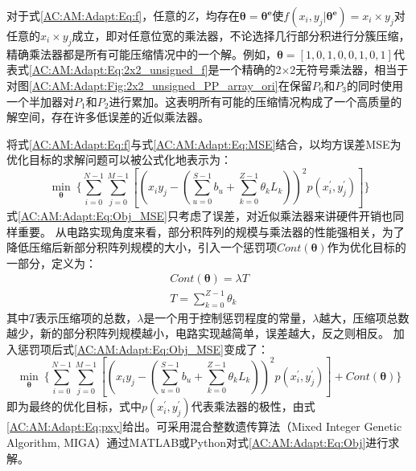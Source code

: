 对于式\eqref{AC:AM:Adapt:Eq:f}，任意的$Z$，均存在$\boldsymbol{\theta} = \boldsymbol{{\theta}^{e}}$使$f(x_i, y_j \vert \boldsymbol{{\theta}^{e}}) =  x_i \times y_j$对任意的$x_i \times y_j$成立，即对任意位宽的乘法器，不论选择几行部分积进行分簇压缩，精确乘法器都是所有可能压缩情况中的一个解。例如，$\boldsymbol{\theta} = [1, 0, 1, 0, 0, 1, 0, 1]$代表式\eqref{AC:AM:Adapt:Eq:2x2_unsigned_f}是一个精确的2$\times$2无符号乘法器，相当于对图\ref{AC:AM:Adapt:Fig:2x2_unsigned_PP_array_ori}在保留$P_0$和$P_3$的同时使用一个半加器对$P_1$和$P_2$进行累加。这表明所有可能的压缩情况构成了一个高质量的解空间，存在许多低误差的近似乘法器。

将式\eqref{AC:AM:Adapt:Eq:f}与式\eqref{AC:AM:Adapt:Eq:MSE}结合，以均方误差MSE为优化目标的求解问题可以被公式化地表示为：
\begin{equation}
    \label{AC:AM:Adapt:Eq:Obj_MSE}
      \mathop{min}\limits_{\boldsymbol{\theta}}\ \{ \sum_{i=0}^{N-1} \sum_{j=0}^{M-1} [(x_iy_j - (\sum\limits_{u=0}^{S-1} b_u + \sum\limits_{k=0}^{Z-1} \theta_k L_k) )^2  p(x^{\prime}_i, y^{\prime}_j) ] \}
\end{equation}
式\eqref{AC:AM:Adapt:Eq:Obj_MSE}只考虑了误差，对近似乘法器来讲硬件开销也同样重要。
从电路实现角度来看，部分积阵列的规模与乘法器的性能强相关，为了降低压缩后新部分积阵列规模的大小，引入一个惩罚项$Cont(\boldsymbol{\theta})$作为优化目标的一部分，定义为：
\begin{align}
    Cont(\boldsymbol{\theta}) = \lambda T \label{AC:AM:Adapt:Eq:Cont} \\
    T = \sum_{k=0}^{Z-1} \theta_k \label{AC:AM:Adapt:Eq:T_exact}
\end{align}
其中$T$表示压缩项的总数，$\lambda$是一个用于控制惩罚程度的常量，$\lambda$越大，压缩项总数越少，新的部分积阵列规模越小，电路实现越简单，误差越大，反之则相反。
加入惩罚项后式\eqref{AC:AM:Adapt:Eq:Obj_MSE}变成了：
\begin{equation}
    \label{AC:AM:Adapt:Eq:Obj}
      \mathop{min}\limits_{\boldsymbol{\theta}}\ \{ \sum_{i=0}^{N-1} \sum_{j=0}^{M-1} [(x_iy_j - (\sum\limits_{u=0}^{S-1} b_u + \sum\limits_{k=0}^{Z-1} \theta_k L_k) )^2  p(x^{\prime}_i, y^{\prime}_j) ] +  Cont(\boldsymbol{\theta}) \}
\end{equation}
即为最终的优化目标，式中$p(x^{\prime}_i, y^{\prime}_j)$代表乘法器的极性，由式\eqref{AC:AM:Adapt:Eq:pxy}给出。可采用混合整数遗传算法（Mixed
Integer Genetic Algorithm, MIGA）通过MATLAB或Python对式\eqref{AC:AM:Adapt:Eq:Obj}进行求解。

